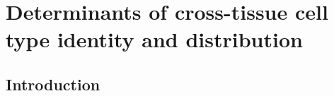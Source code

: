 \chapter{Determinants of cross-tissue cell type identity and distribution} \label{chap:CT_bio}

\ifpdf
    \graphicspath{{Chapter4/Figs/Raster/}{Chapter4/Figs/PDF/}{Chapter4/Figs/}}
\else
    \graphicspath{{Chapter4/Figs/Vector/}{Chapter4/Figs/}}
\fi

\section{Introduction}